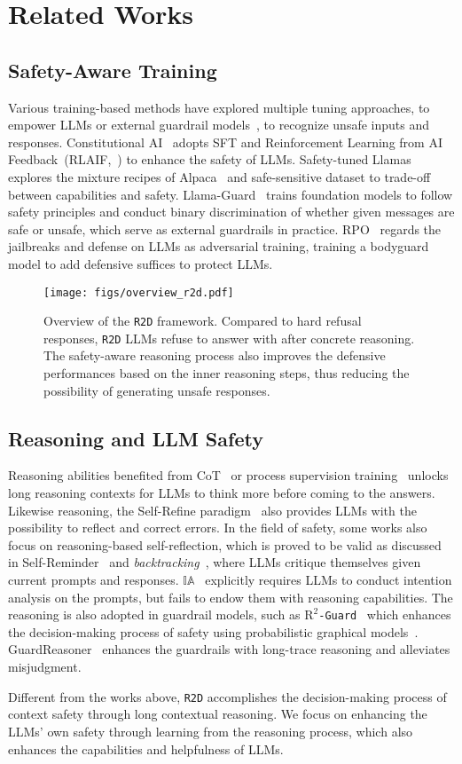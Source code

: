 \section{Related Works}

\subsection{Safety-Aware Training}
Various training-based methods have explored multiple tuning approaches, to empower LLMs or external guardrail models~\cite{inan2023llama}, to recognize unsafe inputs and responses. Constitutional AI~\cite{bai2022constitutional} adopts SFT and Reinforcement Learning from AI Feedback~(RLAIF,~\citealp{pmlr-v235-lee24t}) to enhance the safety of LLMs. Safety-tuned Llamas~\cite{bianchi2024safetytuned} explores the mixture recipes of Alpaca~\cite{taori2023alpaca} and safe-sensitive dataset to trade-off between capabilities and safety. Llama-Guard~\cite{inan2023llama} trains foundation models to follow safety principles and conduct binary discrimination of whether given messages are safe or unsafe, which serve as external guardrails in practice. RPO~\cite{zhou2024robust} regards the jailbreaks and defense on LLMs as adversarial training, training a bodyguard model to add defensive suffices to protect LLMs.

\begin{figure*}[ht!]
    \centering
    \texttt{[image: figs/overview\_r2d.pdf]}
    \caption{Overview of the \texttt{R2D} framework. Compared to hard refusal responses, \texttt{R2D} LLMs refuse to answer with after concrete reasoning. The safety-aware reasoning process also improves the defensive performances based on the inner reasoning steps, thus reducing the possibility of generating unsafe responses.}
\label{fig:overview_r2d}
\end{figure*}

\subsection{Reasoning and LLM Safety}
Reasoning abilities benefited from CoT~\cite{wei2022chain} or process supervision training~\cite{lightman2024lets} unlocks long reasoning contexts for LLMs to think more before coming to the answers. Likewise reasoning, the Self-Refine paradigm~\cite{madaan2023selfrefine} also provides LLMs with the possibility to reflect and correct errors. In the field of safety, some works also focus on reasoning-based self-reflection, which is proved to be valid as discussed in Self-Reminder~\cite{xie2023defending} and \textit{backtracking}~\cite{zhang2025backtracking}, where LLMs critique themselves given current prompts and responses. \textbf{$\mathbb{IA}$}~\cite{zhang-etal-2025-intention} explicitly requires LLMs to conduct intention analysis on the prompts, but fails to endow them with reasoning capabilities. The reasoning is also adopted in guardrail models, such as \texttt{$\text{R}^2$-Guard}~\cite{kang2025rguard} which enhances the decision-making process of safety using probabilistic graphical models~\cite{richardson2006markov, kisa2014probabilistic}. GuardReasoner~\cite{liu2025guardreasoner} enhances the guardrails with long-trace reasoning and alleviates misjudgment.

Different from the works above, \texttt{R2D} accomplishes the decision-making process of context safety through long contextual reasoning. We focus on enhancing the LLMs' own safety through learning from the reasoning process, which also enhances the capabilities and helpfulness of LLMs.
